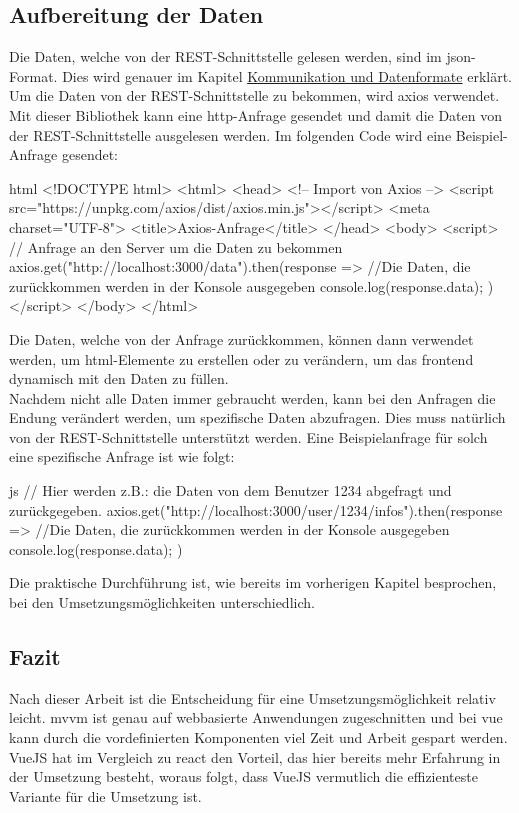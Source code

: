\subsection{Aufbereitung der Daten}
Die Daten, welche von der REST-Schnittstelle gelesen werden, sind im \Gls{json}-Format. Dies wird genauer im Kapitel \hyperref[sec:json]{Kommunikation und Datenformate} erklärt. Um die Daten von der REST-Schnittstelle zu bekommen, wird \Gls{axios} verwendet. Mit dieser Bibliothek kann eine \Gls{http}-Anfrage gesendet und damit die Daten von der REST-Schnittstelle ausgelesen werden. Im folgenden Code wird eine Beispiel-Anfrage gesendet:
\begin{code}{html}
	<!DOCTYPE html>
	<html>
		<head>
			<!-- Import von Axios -->
			<script src="https://unpkg.com/axios/dist/axios.min.js"></script>
			<meta charset="UTF-8">
			<title>Axios-Anfrage</title>
		</head>
		<body>
			<script>
				// Anfrage an den Server um die Daten zu bekommen
				axios.get("http://localhost:3000/data").then(response => {
					//Die Daten, die zurückkommen werden in der Konsole ausgegeben
					console.log(response.data);
				})
			</script>
		</body>
	</html>
\end{code}
Die Daten, welche von der Anfrage zurückkommen, können dann verwendet werden, um \Gls{html}-Elemente zu erstellen oder zu verändern, um das \Gls{frontend} dynamisch mit den Daten zu füllen.\\Nachdem nicht alle Daten immer gebraucht werden, kann bei den Anfragen die Endung verändert werden, um spezifische Daten abzufragen. Dies muss natürlich von der REST-Schnittstelle unterstützt werden. Eine Beispielanfrage für solch eine spezifische Anfrage ist wie folgt:
\begin{code}{js}
	// Hier werden z.B.: die Daten von dem Benutzer 1234 abgefragt und zurückgegeben.
	axios.get("http://localhost:3000/user/1234/infos").then(response => {
		//Die Daten, die zurückkommen werden in der Konsole ausgegeben
		console.log(response.data);
	})
\end{code}

Die praktische Durchführung ist, wie bereits im vorherigen Kapitel besprochen, bei den Umsetzungsmöglichkeiten unterschiedlich.

\subsection{Fazit}
\label{sec:rfoster_fazit}
Nach dieser Arbeit ist die Entscheidung für eine Umsetzungsmöglichkeit relativ leicht. \Gls{mvvm} ist genau auf webbasierte Anwendungen zugeschnitten und bei \Gls{vue} kann durch die vordefinierten Komponenten viel Zeit und Arbeit gespart werden. VueJS hat im Vergleich zu \Gls{react} den Vorteil, das hier bereits mehr Erfahrung in der Umsetzung besteht, woraus folgt, dass VueJS vermutlich die effizienteste Variante für die Umsetzung ist.